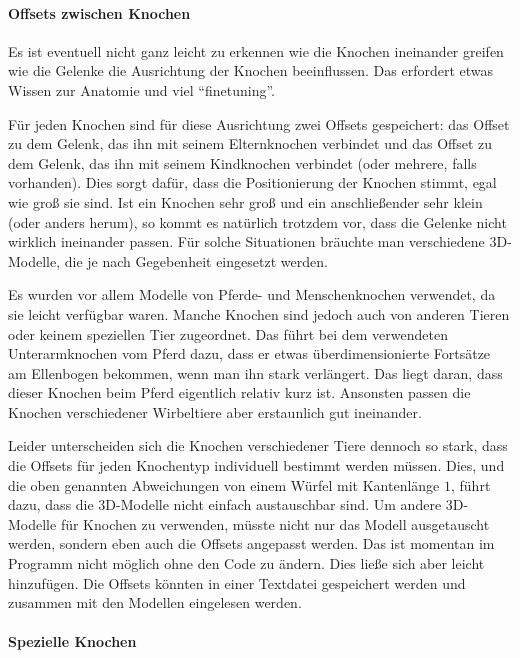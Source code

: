 \paragraph{Offsets zwischen Knochen}
Es ist eventuell nicht ganz leicht zu erkennen wie die Knochen ineinander greifen \bzw wie die Gelenke die Ausrichtung der Knochen beeinflussen. Das erfordert etwas Wissen zur Anatomie und viel "`finetuning"'. 

Für jeden Knochen sind für diese Ausrichtung zwei Offsets gespeichert: das Offset zu dem Gelenk, das ihn mit seinem Elternknochen verbindet und das Offset zu dem Gelenk, das ihn mit seinem Kindknochen verbindet (oder mehrere, falls vorhanden). Dies sorgt dafür, dass die Positionierung der Knochen stimmt, egal wie groß sie sind. Ist ein Knochen sehr groß und ein anschließender sehr klein (oder anders herum), so kommt es natürlich trotzdem vor, dass die Gelenke nicht wirklich ineinander passen. Für solche Situationen bräuchte man verschiedene 3D-Modelle, die je nach Gegebenheit eingesetzt werden.

Es wurden vor allem Modelle von Pferde- und Menschenknochen verwendet, da sie leicht verfügbar waren. Manche Knochen sind jedoch auch von anderen Tieren oder keinem speziellen Tier zugeordnet. Das führt \zb bei dem verwendeten Unterarmknochen vom Pferd dazu, dass er etwas überdimensionierte Fortsätze am Ellenbogen bekommen, wenn man ihn stark verlängert. Das liegt daran, dass dieser Knochen beim Pferd eigentlich relativ kurz ist. Ansonsten passen die Knochen verschiedener Wirbeltiere aber erstaunlich gut ineinander.

Leider unterscheiden sich die Knochen verschiedener Tiere dennoch so stark, dass die Offsets für jeden Knochentyp individuell bestimmt werden müssen. Dies, und die oben genannten Abweichungen von einem Würfel mit Kantenlänge $1$, führt dazu, dass die 3D-Modelle nicht einfach austauschbar sind.
Um andere 3D-Modelle für Knochen zu verwenden, müsste nicht nur das Modell ausgetauscht werden, sondern eben auch die Offsets angepasst werden. Das ist momentan im Programm nicht möglich ohne den Code zu ändern. Dies ließe sich aber leicht hinzufügen. Die Offsets könnten \zb in einer Textdatei gespeichert werden und zusammen mit den Modellen eingelesen werden. 


\paragraph{Spezielle Knochen}

